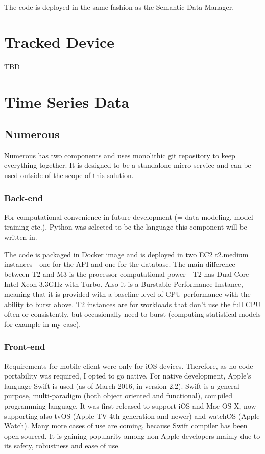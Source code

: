 The code is deployed in the same fashion as the Semantic Data Manager.

\section{Tracked Device}
TBD

\section{Time Series Data}

\subsection{Numerous}
Numerous has two components and uses monolithic git repository to keep everything together. It is designed to be a standalone micro service and can be used outside of the scope of this solution.

\subsubsection{Back-end}
For computational convenience in future development (= data modeling, model training etc.), Python was selected to be the language this component will be written in.

The code is packaged in Docker image and is deployed in two EC2 t2.medium instances - one for the API and one for the database. The main difference between T2 and M3 is the processor computational power - T2 has Dual Core Intel Xeon 3.3GHz with Turbo. Also it is a Burstable Performance Instance, meaning that it is provided with a baseline level of CPU performance with the ability to burst above. T2 instances are for workloads that don't use the full CPU often or consistently, but occasionally need to burst (computing statistical models for example in my case).

\subsubsection{Front-end}
Requirements for mobile client were only for iOS devices. Therefore, as no code portability was required, I opted to go native. For native development, Apple's language Swift is used (as of March 2016, in version 2.2). Swift is a general-purpose, multi-paradigm (both object oriented and functional), compiled programming language. It was first released to support iOS and Mac OS X, now supporting also tvOS (Apple TV 4th generation and newer) and watchOS (Apple Watch). Many more cases of use are coming, because Swift compiler has been open-sourced. It is gaining popularity among non-Apple developers mainly due to its safety, robustness and ease of use.

